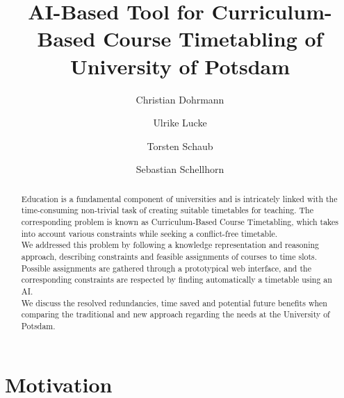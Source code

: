 \documentclass{easychair}
\title{AI-Based Tool for Curriculum-Based Course Timetabling of University of Potsdam}
\author{
Christian Dohrmann 
\and
Ulrike Lucke 
\and
Torsten Schaub 
\and 
Sebastian Schellhorn 
}
\institute{
  University of Potsdam,
  Germany\\
  \email{\{christian.dohrmann, ulrike.lucke, torsten.schaub, sebastian.schellhorn\}@uni-potsdam.de}
 }
\begin{document}
\maketitle

\begin{abstract}
    Education is a fundamental component of universities and is intricately linked with the time-consuming non-trivial task of creating suitable timetables for teaching. 
    The corresponding problem is known as Curriculum-Based Course Timetabling, which takes into account various constraints while seeking a conflict-free timetable. \\
    We addressed this problem by following a knowledge representation and reasoning approach, describing constraints and feasible assignments of courses to time slots. 
    Possible assignments are gathered through a prototypical web interface, and the corresponding constraints are respected by finding automatically a timetable using an AI. \\
    We discuss the resolved redundancies, time saved and potential future benefits when comparing the traditional and new approach regarding the needs at the University of Potsdam. 
\end{abstract}



%
%

\section{Motivation}
\label{sec:motivation}
\end{document}
